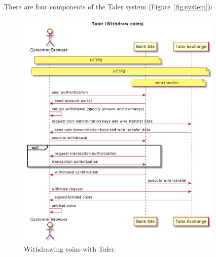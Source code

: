 \documentclass{llncs}
\begin{document}
There are four components of the Taler system (Figure~\ref{fig:system}):

\begin{figure}[b!]
\includegraphics[width=0.9\textwidth]{figs/taler-withdraw.pdf}
\caption{Withdrawing coins with Taler.}
\label{fig:taler-withdraw}
\end{figure}
\end{document}
